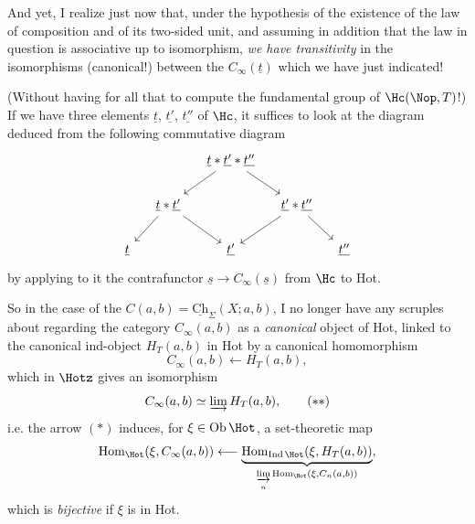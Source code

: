 And yet, I realize just now that, under the hypothesis of the existence of the law of composition and of its two-sided unit, and assuming in addition that the law in question is associative up to isomorphism, \textit{we have transitivity} in the isomorphisms (canonical!) between the $C_\infty(\underline{t})$ which we have just indicated!

(Without having for all that to compute the fundamental group of $\Hc(\Nop, T)$!) If we have three elements $\underline{t}$, $\underline{t'}$, $\underline{t''}$ of $\Hc$, it suffices to look at the diagram deduced from the following commutative diagram
\[
\begin{tikzcd}[column sep=small]
 & & \underline{t} * \underline{t'} * \underline{t''} \arrow[ld] \arrow[rd] & & \\
 & \underline{t} * \underline{t'} \arrow[ld] \arrow[rd] & & \underline{t'} * \underline{t''} \arrow[ld] \arrow[rd] & \\
\underline{t} & & \underline{t'} & & \underline{t''}
\end{tikzcd}
\]
by applying to it the contrafunctor $\underline{s} \longrightarrow C_\infty(\underline{s})$ from $\Hc$ to Hot.

So in the case of the $C(a,b) = \underline{\mathrm{Ch}}_\Sigma(X; a, b)$, I no longer have any scruples about regarding the category $C_\infty(a,b)$ as a \textit{canonical} object of Hot, linked to the canonical ind-object $H_T(a,b)$ in Hot by a canonical homomorphism
\[
C_\infty(a,b) \longleftarrow H_T(a,b), \tag*{$(*)$}
\]
which in $\Hotz$ gives an isomorphism
\[
C_\infty(a,b) \simeq \varinjlim H_T(a,b), \tag*{$(**)$}
\]
i.e. the arrow $(*)$ induces, for $\xi \in \mathrm{Ob}\,\Hot$, a set-theoretic map
\[
\mathrm{Hom}_{\Hot}(\xi, C_\infty(a,b)) \longleftarrow \underbrace{\mathrm{Hom}_{\mathrm{Ind}\,\Hot}(\xi, H_T(a,b))}_{\underset{n}{\varinjlim}\, \mathrm{Hom}_{\Hot}(\xi, C_n(a,b))},
\]
which is \textit{bijective} if $\xi$ is in Hot.

